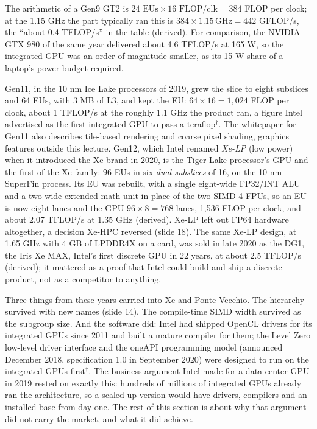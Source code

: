 \documentclass[11pt,letterpaper]{article}
\begin{document}
The arithmetic of a Gen9 GT2 is $24 \text{ EUs} \times 16 \text{ FLOP/clk} = 384$ FLOP per clock; at the 1.15 GHz the part typically ran this is $384 \times 1.15\,\text{GHz} = 442$ GFLOP/s, the ``about 0.4 TFLOP/s'' in the table (derived). For comparison, the NVIDIA GTX 980 of the same year delivered about 4.6 TFLOP/s at 165 W, so the integrated GPU was an order of magnitude smaller, as its 15 W share of a laptop's power budget required.

Gen11, in the 10 nm Ice Lake processors of 2019, grew the slice to eight subslices and 64 EUs, with 3 MB of L3, and kept the EU: $64 \times 16 = 1{,}024$ FLOP per clock, about 1 TFLOP/s at the roughly 1.1 GHz the product ran, a figure Intel advertised as the first integrated GPU to pass a teraflop$^\dagger$. The whitepaper for Gen11 also describes tile-based rendering and coarse pixel shading, graphics features outside this lecture. Gen12, which Intel renamed \emph{Xe-LP} (low power) when it introduced the Xe brand in 2020, is the Tiger Lake processor's GPU and the first of the Xe family: 96 EUs in six \emph{dual subslices} of 16, on the 10 nm SuperFin process. Its EU was rebuilt, with a single eight-wide FP32/INT ALU and a two-wide extended-math unit in place of the two SIMD-4 FPUs, so an EU is now eight lanes and the GPU $96 \times 8 = 768$ lanes, 1{,}536 FLOP per clock, and about 2.07 TFLOP/s at 1.35 GHz (derived). Xe-LP left out FP64 hardware altogether, a decision Xe-HPC reversed (slide 18). The same Xe-LP design, at 1.65 GHz with 4 GB of LPDDR4X on a card, was sold in late 2020 as the DG1, the Iris Xe MAX, Intel's first discrete GPU in 22 years, at about 2.5 TFLOP/s (derived); it mattered as a proof that Intel could build and ship a discrete product, not as a competitor to anything.

Three things from these years carried into Xe and Ponte Vecchio. The hierarchy survived with new names (slide 14). The compile-time SIMD width survived as the subgroup size. And the software did: Intel had shipped OpenCL drivers for its integrated GPUs since 2011 and built a mature compiler for them; the Level Zero low-level driver interface and the oneAPI programming model (announced December 2018, specification 1.0 in September 2020) were designed to run on the integrated GPUs first$^\dagger$. The business argument Intel made for a data-center GPU in 2019 rested on exactly this: hundreds of millions of integrated GPUs already ran the architecture, so a scaled-up version would have drivers, compilers and an installed base from day one. The rest of this section is about why that argument did not carry the market, and what it did achieve.
\end{document}
